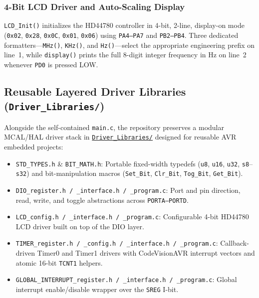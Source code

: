 \documentclass[11pt,a4paper]{article}
\newcommand{\githubrepo}{https://github.com/m7mdelsayegh/frequency_meter}
\newcommand{\ghtree}[2]{\href{\githubrepo/tree/main/#1}{\texttt{#2}}}
\begin{document}
\subsubsection{4-Bit LCD Driver and Auto-Scaling Display}
\texttt{LCD\_Init()} initializes the HD44780 controller in 4-bit, 2-line, display-on mode (\texttt{0x02}, \texttt{0x28}, \texttt{0x0C}, \texttt{0x01}, \texttt{0x06}) using \texttt{PA4--PA7} and \texttt{PB2--PB4}. Three dedicated formatters---\texttt{MHz()}, \texttt{KHz()}, and \texttt{Hz()}---select the appropriate engineering prefix on line~1, while \texttt{display()} prints the full 8-digit integer frequency in Hz on line~2 whenever \texttt{PD0} is pressed LOW.

\subsection{Reusable Layered Driver Libraries (\texttt{Driver\_Libraries/})}
Alongside the self-contained \texttt{main.c}, the repository preserves a modular MCAL/HAL driver stack in \ghtree{2_CodeVisionAVR_Firmware/Driver_Libraries}{Driver\_Libraries/} designed for reusable AVR embedded projects:
\begin{itemize}[leftmargin=1.5em]
    \item \texttt{STD\_TYPES.h} \& \texttt{BIT\_MATH.h}: Portable fixed-width typedefs (\texttt{u8}, \texttt{u16}, \texttt{u32}, \texttt{s8}--\texttt{s32}) and bit-manipulation macros (\texttt{Set\_Bit}, \texttt{Clr\_Bit}, \texttt{Tog\_Bit}, \texttt{Get\_Bit}).
    \item \texttt{DIO\_register.h / \_interface.h / \_program.c}: Port and pin direction, read, write, and toggle abstractions across \texttt{PORTA--PORTD}.
    \item \texttt{LCD\_config.h / \_interface.h / \_program.c}: Configurable 4-bit HD44780 LCD driver built on top of the DIO layer.
    \item \texttt{TIMER\_register.h / \_config.h / \_interface.h / \_program.c}: Callback-driven Timer0 and Timer1 drivers with CodeVisionAVR interrupt vectors and atomic 16-bit \texttt{TCNT1} helpers.
    \item \texttt{GLOBAL\_INTERRUPT\_register.h / \_interface.h / \_program.c}: Global interrupt enable/disable wrapper over the \texttt{SREG} I-bit.
\end{itemize}

\end{document}
